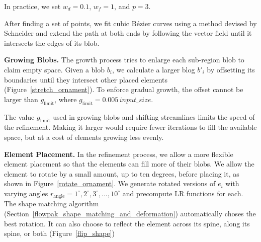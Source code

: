 In practice, we set $w_d = 0.1$, $w_f=1$, and $p = 3$.

After finding a set of points, we fit cubic B\'ezier curves using a method
devised by Schneider \cite{Schneider1990} and extend the path at both ends 
by following
the vector field until it intersects the edges of its blob. 

\textbf{Growing Blobs.} The growth process tries to enlarge each sub-region blob to
claim empty space.
Given a blob $b_{i}$, we calculate a larger blog $b'_{i}$ 
by offsetting its boundaries until they intersect other placed elements (Figure~\ref{stretch_ornament}).
To enforce gradual growth, the offset cannot be larger than $g_\mathrm{limit}$, where
$g_\mathrm{limit}=0.005\,input\_size$.

The value $g_\mathrm{limit}$ used in growing blobs and shifting streamlines limits the speed of
the refinement.  Making it larger would require fewer iterations to fill the available space,
but at a cost of elements growing less evenly. 

\textbf{Element Placement.}
In the refinement process, we allow a more flexible element placement so that
the elements can fill more of their blobs.  We allow the element
to rotate by a small amount, up to ten degrees, before placing it, as shown in
Figure~\ref{rotate_ornament}. 
We generate rotated versions of $e_{i}$ 
with varying angles $r_\mathrm{angle} = {1^{\circ}, 2^{\circ}, 3^{\circ}, ..., 10^{\circ}}$
and precompute LR functions for each. The shape matching algorithm
(Section~\ref{flowpak_shape_matching_and_deformation}) automatically choses the best rotation. It
can also choose to reflect the element across its spine, along its spine, or both (Figure~\ref{flip_shape})

